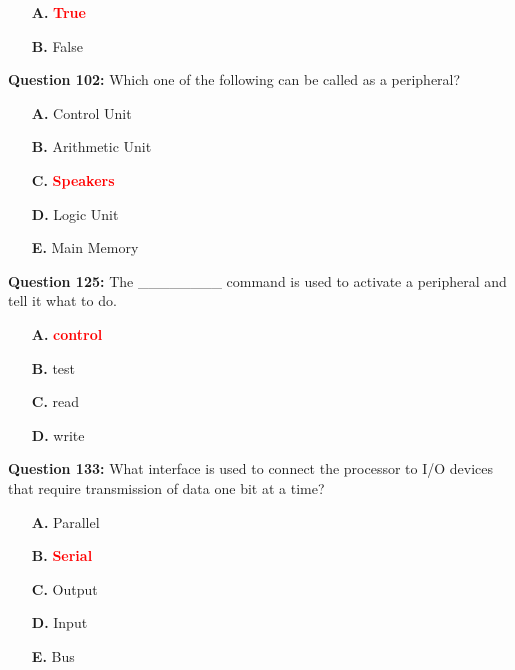 \documentclass[12pt,a4paper]{article}
\begin{document}
\begin{itemize}
    \item[\textbf{A.}] \textcolor{red}{\textbf{True}}
    \item[\textbf{B.}] False
\end{itemize}

\vspace{0.5cm}

\textbf{Question 102:} Which one of the following can be called as a peripheral?

\begin{itemize}
    \item[\textbf{A.}] Control Unit
    \item[\textbf{B.}] Arithmetic Unit
    \item[\textbf{C.}] \textcolor{red}{\textbf{Speakers}}
    \item[\textbf{D.}] Logic Unit
    \item[\textbf{E.}] Main Memory
\end{itemize}

\vspace{0.5cm}

\textbf{Question 125:} The ________ command is used to activate a peripheral and tell it what to do.

\begin{itemize}
    \item[\textbf{A.}] \textcolor{red}{\textbf{control}}
    \item[\textbf{B.}] test
    \item[\textbf{C.}] read
    \item[\textbf{D.}] write
\end{itemize}

\vspace{0.5cm}

\textbf{Question 133:} What interface is used to connect the processor to I/O devices that require transmission of data one bit at a time?

\begin{itemize}
    \item[\textbf{A.}] Parallel
    \item[\textbf{B.}] \textcolor{red}{\textbf{Serial}}
    \item[\textbf{C.}] Output
    \item[\textbf{D.}] Input
    \item[\textbf{E.}] Bus
\end{itemize}

\vspace{0.5cm}
\end{document}
